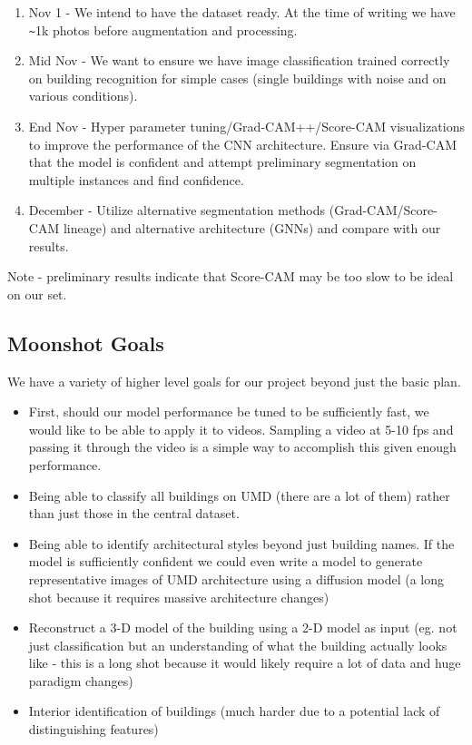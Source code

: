 \documentclass{article}
\begin{document}
\begin{enumerate}
    \item Nov 1 - We intend to have the dataset ready. At the time of writing we have \verb|~|1k photos before augmentation and processing.
    \item Mid Nov - We want to ensure we have image classification trained correctly on building recognition for simple cases (single buildings with noise and on various conditions). 
    \item End Nov - Hyper parameter tuning/Grad-CAM++/Score-CAM visualizations to improve the performance of the CNN architecture. Ensure via Grad-CAM that the model is confident and attempt preliminary segmentation on multiple instances and find confidence.
    \item December - Utilize alternative segmentation methods (Grad-CAM/Score-CAM lineage) and alternative architecture (GNNs) and compare with our results.
\end{enumerate}

Note - preliminary results indicate that Score-CAM may be too slow to be ideal on our set.


\subsection{Moonshot Goals}


We have a variety of higher level goals for our project beyond just the basic plan. \begin{itemize}
    \item First, should our model performance be tuned to be sufficiently fast, we would like to be able to apply it to videos. Sampling a video at 5-10 fps and passing it through the video is a simple way to accomplish this given enough performance.
    \item Being able to classify all buildings on UMD (there are a lot of them) rather than just those in the central dataset. 
    \item Being able to identify architectural styles beyond just building names. If the model is sufficiently confident we could even write a model to generate representative images of UMD architecture using a diffusion model (a long shot because it requires massive architecture changes)
    \item Reconstruct a 3-D model of the building using a 2-D model as input (eg. not just classification but an understanding of what the building actually looks like - this is a long shot because it would likely require a lot of data and huge paradigm changes)
    \item Interior identification of buildings (much harder due to a potential lack of distinguishing features)
\end{itemize}
\end{document}
